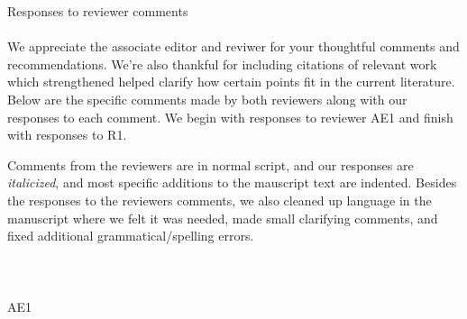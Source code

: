 \documentclass[ba]{imsart}
\newcommand{\1}[1]{\mathds{1}\left[#1\right]}
\begin{document}
\Huge
\noindent Responses to reviewer comments
\normalsize
\\~\\
We appreciate the associate editor and reviwer for your thoughtful comments and 
recommendations. We're also thankful for including citations of relevant work
which strengthened helped clarify how certain points fit in the current 
literature. Below are the specific comments made by both reviewers along
with our responses to each comment. We begin with responses to 
reviewer AE1 and finish with responses to R1. 

Comments from the reviewers are in normal script, and 
our responses are \emph{italicized}, and 
most specific additions to the mauscript
text are indented. Besides the responses to the reviewers comments, we also 
cleaned up language in the manuscript where we felt it was needed, made small
clarifying comments, and fixed additional grammatical/spelling errors.
\\~\\
\\~\\
\Huge
\noindent AE1
\normalsize
\end{document}
